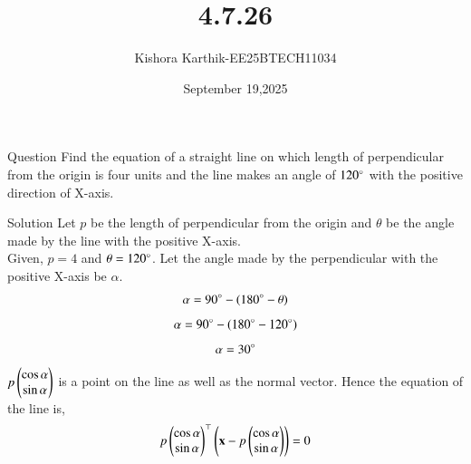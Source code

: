 \documentclass{beamer}
\begin{document}
\title 
{4.7.26}
\date{September 19,2025}


\author 
{Kishora Karthik-EE25BTECH11034}
\frame{\titlepage}
\begin{frame}{Question}
Find the equation of a straight line on which length of perpendicular from the origin is four units and the line makes an angle of $120\degree$ with the positive direction of X-axis.
\end{frame}

\begin{frame}{ Solution}
Let $p$ be the length of perpendicular from the origin and $\theta$ be the angle made by the line with the positive X-axis.\\
Given, $p=4$ and $\theta=120\degree$.
Let the angle made by the perpendicular with the positive X-axis be $\alpha$.
\begin{align}
    \alpha=90\degree-(180\degree-\theta)
\end{align}
\begin{align}
    \alpha=90\degree-(180\degree-120\degree)
\end{align}
\begin{align}
    \alpha=30\degree
\end{align}
$p\begin{pmatrix} \cos\alpha \\ \sin\alpha \end{pmatrix}$
is a point on the line as well as the normal vector. Hence the equation of the line is,
\begin{align}
p\begin{pmatrix} \cos\alpha \\ \sin\alpha\end{pmatrix}^\top\left(\mathbf{x} - p  \begin{pmatrix} \cos\alpha \\ \sin\alpha\end{pmatrix}\right)   = 0
\end{align}
\end{frame}
\end{document}
